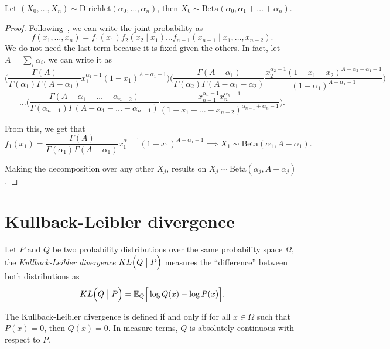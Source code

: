 \begin{proposition}\label{prop:dirichlet_marginal}
  Let
  \((X_{0},\dots, X_{n}) \sim \text{Dirichlet}(\alpha_{0}, \dots, \alpha_{n})\),
  then \(X_{0} \sim \text{Beta}(\alpha_{0}, \alpha_{1}+\dots +\alpha_{n})\).
\end{proposition}
\begin{proof}
  Following~\cite{farrow}, we can write the joint probability as
  \[
    f(x_{1},\dots,x_{n}) = f_{1}(x_{1})f_{2}(x_{2}\mid x_{1})\dots f_{n-1}(x_{n-1}\mid x_{1},\dots, x_{n-2}).
  \]
  We do not need the last term because it is fixed given the others. In fact, let \(A = \sum_{i} \alpha_{i}\), we can write it as
  \[
   \Bigg( \frac{\Gamma(A)}{\Gamma(\alpha_{1}) \Gamma(A - \alpha_{1})}x_{1}^{\alpha_{1}-1}(1 - x_{1})^{A - \alpha_{1} -1}\Bigg)\Bigg( \frac{\Gamma(A - \alpha_{1})}{\Gamma(\alpha_{2}) \Gamma(A - \alpha_{1} - \alpha_{2})}\frac{ x_{2}^{\alpha_{2}-1}(1-x_{1}- x_{2})^{A - \alpha_{2}- \alpha_{1} - 1} }{(1-\alpha_{1})^{A - \alpha_{1} - 1} }\Bigg )
 \]
 \[
   \dots \Big(\frac{\Gamma(A - \alpha_{1} - \dots - \alpha_{n-2})}{\Gamma(\alpha_{n-1}) \Gamma(A - \alpha_{1}- \dots - \alpha_{n-1})}  \frac{ x_{n-1}^{\alpha_{n}-1} x_{n}^{\alpha_{n}-1}}{(1-x_{1}- \dots - x_{n-2})^{\alpha_{n-1}+\alpha_{n}-1}}\Big).
 \]

 From this, we get that
 \[
   f_{1}(x_{1}) =  \frac{\Gamma(A)}{\Gamma(\alpha_{1}) \Gamma(A - \alpha_{1})}x_{1}^{\alpha_{1}-1}(1 - x_{1})^{A - \alpha_{1} -1} \implies X_{1} \sim \text{Beta}(\alpha_{1}, A- \alpha_{1}).
 \]

 Making the decomposition over any other \(X_{j}\), results on
 \(X_{j} \sim \text{Beta}(\alpha_{j}, A - \alpha_{j})\).
\end{proof}



\section{Kullback-Leibler divergence}

\begin{definition}
  Let \(P\) and \(Q\) be two probability distributions over the same probability space \( \Omega \), the \emph{Kullback-Leibler divergence}
  \(KL\Big(Q \bigm| P\Big)\) measures the ``difference'' between both distributions as
  \[
    KL\Big(Q \bigm| P\Big) = \mathbb{E}_{Q}\Big[\log Q(x) - \log P(x)\Big].
  \]

  The Kullback-Leibler divergence is defined if and only if for all \( x \in \Omega \) such that \( P(x) = 0 \), then \( Q(x) = 0 \). In measure terms, \( Q \) is absolutely continuous with respect to \( P \).
\end{definition}

